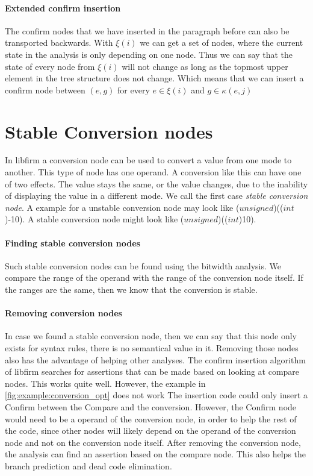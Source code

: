 \paragraph{Extended confirm insertion}
The confirm nodes that we have inserted in the paragraph before can also be transported backwards.
With $\xi(i)$ we can get a set of nodes, where the current state in the analysis is only depending on one node. Thus we can say that the state of every node from $\xi(i)$ will not change as long as the topmost upper element in the tree structure does not change. Which means that we can insert a confirm node between $(e,g)$ for every $e \in \xi(i)$ and $g \in \kappa(e, j)$

\section{Stable Conversion nodes}
In libfirm a conversion node can be used to convert a value from one mode to another. This type of node has one operand. A conversion like this can have one of two effects. The value stays the same, or the value changes, due to the inability of displaying the value in a different mode. We call the first case \textit{stable conversion node}. A example for a unstable conversion node may look like ($unsigned$)(($int$)-10). A stable conversion node might look like ($unsigned$)(($int$)10).

\paragraph{Finding stable conversion nodes}
Such stable conversion nodes can be found using the bitwidth analysis. We compare the range of the operand with the range of the conversion node itself. If the ranges are the same, then we know that the conversion is stable.

\paragraph{Removing conversion nodes}

In case we found a stable conversion node, then we can say that this node only exists for syntax rules, there is no semantical value in it. Removing those nodes also has the advantage of helping other analyses. The confirm insertion algorithm of libfirm  searches for assertions that can be made based on looking at compare nodes. This works quite well. However, the example in \autoref{fig:example:conversion_opt} does not work
The insertion code could only insert a Confirm between the Compare and the conversion. However, the Confirm node would need to be a operand of the conversion node, in order to help the rest of the code, since other nodes will likely depend on the operand of the conversion node and not on the conversion node itself. 
After removing the conversion node, the analysis can find an assertion based on the compare node. This also helps the branch prediction and dead code elimination.

